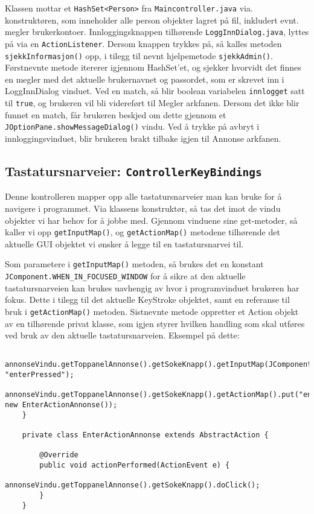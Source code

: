Klassen mottar et \texttt{HashSet<Person>} fra \texttt{Maincontroller.java} via. konstruktøren, som inneholder alle person objekter lagret på fil, inkludert evnt. megler brukerkontoer. Innloggingsknappen tilhørende \texttt{LoggInnDialog.java}, lyttes på via en \texttt{ActionListener}. Dersom knappen trykkes på, så kalles metoden \texttt{sjekkInformasjon()} opp, i tilegg til nevnt hjelpemetode \texttt{sjekkAdmin()}. 
Førstnevnte metode itererer igjennom HashSet'et, og sjekker hvorvidt det finnes en megler med det aktuelle brukernavnet og passordet, som er skrevet inn i LoggInnDialog vinduet. Ved en match, så blir boolean variabelen \texttt{innlogget} satt til \texttt{true}, og brukeren vil bli videreført til Megler arkfanen. Dersom det ikke blir funnet en match, får brukeren beskjed om dette gjennom et \texttt{JOptionPane.showMessageDialog()} vindu. Ved å trykke på avbryt i innloggingsvinduet, blir brukeren brakt tilbake igjen til Annonse arkfanen. 

\subsection{Tastatursnarveier: \texttt{ControllerKeyBindings}}
Denne kontrolleren mapper opp alle tastatursnarveier man kan bruke for å navigere i programmet. Via klassens konstruktør, så tas det imot de vindu objekter vi har behov for å jobbe med.
Gjennom vinduene sine get-metoder, så kaller vi opp \texttt{getInputMap()}, og \texttt{getActionMap()} metodene tilhørende det aktuelle GUI objektet vi ønsker å legge til en tastatursnarvei til. 

Som parametere i \texttt{getInputMap()} metoden, så brukes det en konstant \texttt{JComponent.WHEN_IN_FOCUSED_WINDOW} for å sikre at den aktuelle tastatursnarveien kan brukes uavhengig av hvor i programvinduet brukeren har fokus. Dette i tilegg til det aktuelle KeyStroke objektet, samt en referanse til bruk i \texttt{getActionMap()} metoden. Sistnevnte metode oppretter et Action objekt av en tilhørende privat klasse, som igjen styrer hvilken handling som skal utføres ved bruk av den aktuelle tastatursnarveien. Eksempel på dette:

\begin{lstlisting}
        annonseVindu.getToppanelAnnonse().getSokeKnapp().getInputMap(JComponent.WHEN_IN_FOCUSED_WINDOW).put(KeyStroke.getKeyStroke("ENTER"), "enterPressed");
        annonseVindu.getToppanelAnnonse().getSokeKnapp().getActionMap().put("enterPressed", new EnterActionAnnonse());
    }

    private class EnterActionAnnonse extends AbstractAction {

        @Override
        public void actionPerformed(ActionEvent e) {
            annonseVindu.getToppanelAnnonse().getSokeKnapp().doClick();
        }
    }
\end{lstlisting}    



